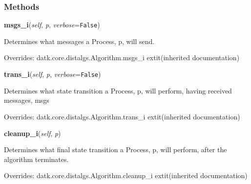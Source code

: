 
  \subsubsection{Methods}

    \vspace{0.5ex}

\hspace{.8\funcindent}\begin{boxedminipage}{\funcwidth}

    \raggedright \textbf{msgs\_i}(\textit{self}, \textit{p}, \textit{verbose}={\tt False})

\setlength{\parskip}{2ex}
    Determines what messages a Process, p, will send.

\setlength{\parskip}{1ex}
      Overrides: datk.core.distalgs.Algorithm.msgs\_i 	extit{(inherited documentation)}

    \end{boxedminipage}

    \vspace{0.5ex}

\hspace{.8\funcindent}\begin{boxedminipage}{\funcwidth}

    \raggedright \textbf{trans\_i}(\textit{self}, \textit{p}, \textit{verbose}={\tt False})

\setlength{\parskip}{2ex}
    Determines what state transition a Process, p, will perform, having 
    received messages, msgs

\setlength{\parskip}{1ex}
      Overrides: datk.core.distalgs.Algorithm.trans\_i 	extit{(inherited documentation)}

    \end{boxedminipage}

    \vspace{0.5ex}

\hspace{.8\funcindent}\begin{boxedminipage}{\funcwidth}

    \raggedright \textbf{cleanup\_i}(\textit{self}, \textit{p})

\setlength{\parskip}{2ex}
    Determines what final state transition a Process, p, will perform, 
    after the algorithm terminates.

\setlength{\parskip}{1ex}
      Overrides: datk.core.distalgs.Algorithm.cleanup\_i 	extit{(inherited documentation)}

    \end{boxedminipage}


